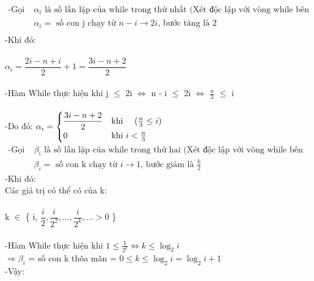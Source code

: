 \documentclass[12pt, letterpaper]{article}
\begin{document}
$ \begin{aligned}
		\text{-Gọi } & \alpha_i \text{ là số lần lặp của while trong thứ nhất (Xét độc lập với vòng while bên ngoài)} \\
		             & \alpha_i = \text{ số con j chạy từ } n - i \rightarrow 2i \text{, bước tăng là 2}              \\
	\end{aligned} $ \\
-Khi đó:\\ \\
$\alpha_i = \dfrac{2i - n + i}{2} + 1 = \dfrac{3i - n + 2}{2}$\\ \\
-Hàm While thực hiện khi j $\leq$ 2i $\Leftrightarrow$ n - i $\leq$ 2i $\Leftrightarrow$ $\frac{n}{3}$ $\leq$ i\\ \\
-Do đó: $\alpha_i =
	\begin{cases}
		\dfrac{3i - n + 2}{2} & \text{khi } \quad (\frac{n}{3} \leq i) \\
		0                     & \text{khi } i < \frac{n}{3}
	\end{cases} \\ \\ $
$ \begin{aligned}
		\text{-Gọi } & \beta_i \text{ là số lần lặp của while trong thứ hai (Xét độc lập với vòng while bên ngoài)} \\
		             & \beta_i = \text{ số con k chạy từ } i \rightarrow 1 \text{, bước giảm là } \frac{k}{2}
	\end{aligned} $ \\
-Khi đó:\\
Các giá trị có thể có của k: \\ \\
k $\in$ \{ i, $\dfrac{i}{2}, \dfrac{i}{2^2}, \ldots, \dfrac{i}{2^k}, \ldots >0$ \} \\ \\
-Hàm While thực hiện khi $1 \leq \frac{1}{2^k}  \Leftrightarrow k \leq \log_2 i$\\
$\Rightarrow \beta_i$ = số \space con k thõa mãn = $0 \leq k \leq \log_2 i = \log_2 i+1$\\
-Vậy: \\
\end{document}
